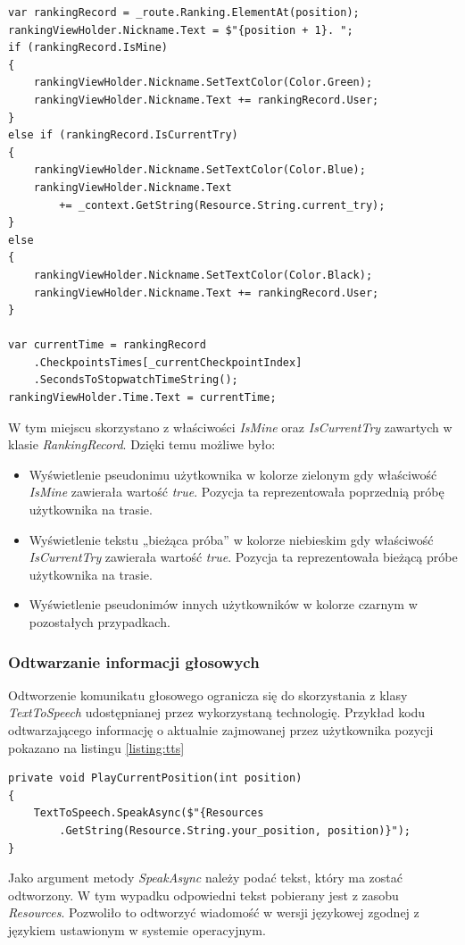 \begin{lstlisting}[caption={Wyświetlanie rankingu},label=listing:adapter]
var rankingRecord = _route.Ranking.ElementAt(position);
rankingViewHolder.Nickname.Text = $"{position + 1}. ";
if (rankingRecord.IsMine)
{
    rankingViewHolder.Nickname.SetTextColor(Color.Green);
    rankingViewHolder.Nickname.Text += rankingRecord.User;
}
else if (rankingRecord.IsCurrentTry)
{
    rankingViewHolder.Nickname.SetTextColor(Color.Blue);
    rankingViewHolder.Nickname.Text 
    	+= _context.GetString(Resource.String.current_try);
}
else
{
    rankingViewHolder.Nickname.SetTextColor(Color.Black);
    rankingViewHolder.Nickname.Text += rankingRecord.User;
}

var currentTime = rankingRecord
	.CheckpointsTimes[_currentCheckpointIndex]
	.SecondsToStopwatchTimeString();
rankingViewHolder.Time.Text = currentTime;
\end{lstlisting}
W tym miejscu skorzystano z właściwości \textit{IsMine} oraz \textit{IsCurrentTry} zawartych w klasie \textit{RankingRecord}. Dzięki temu możliwe było:
\begin{itemize}
\item{Wyświetlenie pseudonimu użytkownika w kolorze zielonym gdy właściwość \textit{IsMine} zawierała wartość \textit{true}. Pozycja ta reprezentowała poprzednią próbę użytkownika na trasie.}
\item{Wyświetlenie tekstu  „bieżąca próba” w kolorze niebieskim gdy właściwość \textit{IsCurrentTry} zawierała wartość \textit{true}. Pozycja ta reprezentowała bieżącą próbe użytkownika na trasie.} 
\item{Wyświetlenie pseudonimów innych użytkowników w kolorze czarnym w pozostałych przypadkach}.
\end{itemize}

\subsubsection{Odtwarzanie informacji głosowych}
Odtworzenie komunikatu głosowego ogranicza się do skorzystania z klasy \textit {TextToSpeech} udostępnianej przez wykorzystaną technologię. Przykład kodu odtwarzającego informację o aktualnie zajmowanej przez użytkownika pozycji pokazano na listingu \ref{listing:tts}
\begin{lstlisting}[caption={Odtworzenie informacji głosowej o aktualnie zajmowanej pozycji},label=listing:tts]
private void PlayCurrentPosition(int position)
{
    TextToSpeech.SpeakAsync($"{Resources
    	.GetString(Resource.String.your_position, position)}");
}
\end{lstlisting}
Jako argument metody \textit{SpeakAsync} należy podać tekst, który ma zostać odtworzony. W tym wypadku odpowiedni tekst pobierany jest z zasobu \textit{Resources}. Pozwoliło to odtworzyć wiadomość w wersji językowej zgodnej z językiem ustawionym w systemie operacyjnym.

